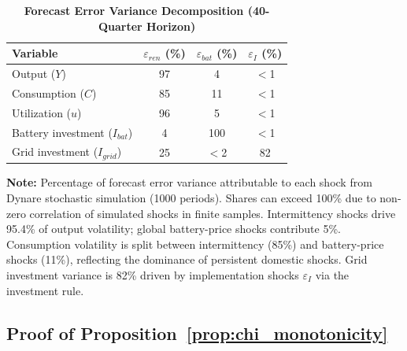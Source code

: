 \begin{table}[H]
\centering
\caption[Forecast Error Variance Decomposition (40-Quarter Horizon)]{\textbf{Forecast Error Variance Decomposition (40-Quarter Horizon)}}
\label{tab:fevd}
\renewcommand{\arraystretch}{1.3}
\small
\begin{tabular}{l c c c}
\toprule
\textbf{Variable} & $\varepsilon_{ren}$ (\%) & $\varepsilon_{bat}$ (\%) & $\varepsilon_I$ (\%) \\
\midrule
Output ($Y$) & 97 & 4 & $<$1 \\
Consumption ($C$) & 85 & 11 & $<$1 \\
Utilization ($u$) & 96 & 5 & $<$1 \\
Battery investment ($I_{bat}$) & 4 & 100 & $<$1 \\
Grid investment ($I_{grid}$) & 25 & $<$2 & 82 \\
\bottomrule
\end{tabular}
\vspace{0.2cm}
\parbox{\textwidth}{\footnotesize \textbf{Note:} Percentage of forecast error variance attributable to each shock from Dynare stochastic simulation (1000 periods). Shares can exceed 100\% due to non-zero correlation of simulated shocks in finite samples. Intermittency shocks drive 95.4\% of output volatility; global battery-price shocks contribute 5\%. Consumption volatility is split between intermittency (85\%) and battery-price shocks (11\%), reflecting the dominance of persistent domestic shocks. Grid investment variance is 82\% driven by implementation shocks $\varepsilon_I$ via the investment rule.}
\end{table}

	\subsection{Proof of Proposition~\ref{prop:chi_monotonicity}} \label{app:proof_chi}
	
